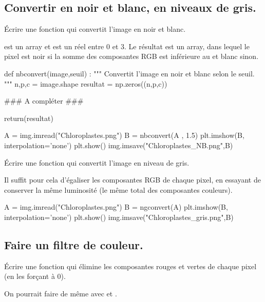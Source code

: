 \documentclass[french,11pt,twoside]{VcCours}
\begin{document}
\subsection{Convertir en noir et blanc, en niveaux de gris.}
\begin{Exercice}
	Écrire une fonction  qui convertit l'image en noir et blanc.

	 est un array et  est un réel entre $0$ et $3$. Le résultat est un array,
	dans lequel le pixel est noir si la somme des composantes RGB est inférieure au  et blanc sinon.
\end{Exercice}
\begin{PY}
def nbconvert(image,seuil) :
    """ Convertit l'image en noir et blanc selon le seuil.
    """
    n,p,c = image.shape
    resultat = np.zeros((n,p,c))

    ### A compléter ###
        
    return(resultat)
\end{PY}
\begin{PY}
A = img.imread("Chloroplastes.png")
B = nbconvert(A , 1.5)
plt.imshow(B, interpolation='none')
plt.show()
img.imsave("Chloroplastes_NB.png",B)
\end{PY}

\begin{Exercice}
Écrire une fonction  qui convertit l'image en niveau de gris.

Il suffit pour cela d'égaliser les composantes RGB de chaque pixel, en essayant de
conserver la même luminosité (le même total des composantes couleurs).
\end{Exercice}

\begin{PY}
A = img.imread("Chloroplastes.png")
B = ngconvert(A)
plt.imshow(B, interpolation='none')
plt.show()
img.imsave("Chloroplastes_gris.png",B)
\end{PY}

\subsection{Faire un filtre de couleur.}
\begin{Exercice}
	Écrire une fonction  qui élimine les composantes rouges et
	vertes de chaque pixel (en les forçant à 0).

	On pourrait faire de même avec  et .
\end{Exercice}
\end{document}
